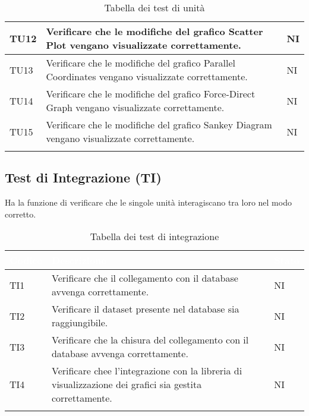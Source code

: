 \begin{center}
\begin{longtable}{|p{1.5cm}|p{11cm}|p{1cm}|}
            TU12 & Verificare che le modifiche del grafico Scatter Plot vengano visualizzate correttamente. & NI\\ \hline
            \rowcolor[HTML]{EFEFEF}
            TU13 & Verificare che le modifiche del grafico Parallel Coordinates vengano visualizzate correttamente. & NI\\ \hline
            \rowcolor[HTML]{C0C0C0}
            TU14 & Verificare che le modifiche del grafico Force-Direct Graph vengano visualizzate correttamente. & NI\\ \hline
            \rowcolor[HTML]{EFEFEF}
            TU15 & Verificare che le modifiche del grafico Sankey Diagram vengano visualizzate correttamente. & NI\\ \hline
            \caption{Tabella dei test di unità}
        \end{longtable}
    \end{center}

    \subsection{Test di Integrazione (TI)} Ha la funzione di verificare che le singole unità interagiscano tra loro nel modo corretto.
    \begin{center}
        \renewcommand\arraystretch{1.5}
        \centering
        \begin{longtable}{|p{1.5cm}|p{11cm}|p{1cm}|}
        \hline
        \rowcolor[HTML]{036400}
        \textcolor{white}{\textbf{Codice}} & \textcolor{white}{\textbf{Descrizione}} & \textcolor{white}{\textbf{Stato}} \\ \hline
            \rowcolor[HTML]{EFEFEF}
            TI1 & Verificare che il collegamento con il database avvenga correttamente. & NI\\ \hline
            \rowcolor[HTML]{C0C0C0}
            TI2 & Verificare il dataset presente nel database sia raggiungibile. & NI\\ \hline
            \rowcolor[HTML]{EFEFEF}
            TI3 & Verificare che la chisura del collegamento con il database avvenga correttamente. & NI\\ \hline
            \rowcolor[HTML]{C0C0C0}
            TI4 & Verificare chee l’integrazione con la libreria di visualizzazione dei grafici sia gestita correttamente. & NI\\ \hline   
            \caption{Tabella dei test di integrazione}
        \end{longtable}
    \end{center}

